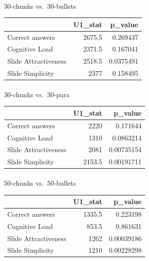 \documentclass[
  letterpaper,
  DIV=11,
  numbers=noendperiod]{scrartcl}
\makeatletter
\let\oldparagraph\paragraph
\renewcommand{\paragraph}{
    \@ifstar
      \xxxParagraphStar
      \xxxParagraphNoStar
  }
\newcommand{\xxxParagraphStar}[1]{\oldparagraph*{#1}\mbox{}}
\newcommand{\xxxParagraphNoStar}[1]{\oldparagraph{#1}\mbox{}}
\newcounter{none} %
\makeatother
\begin{document}
\paragraph{30-chunks vs.~30-bullets}\label{chunks-vs.-30-bullets}

{\def\LTcaptype{none} %
\begin{longtable}[]{@{}lrr@{}}
\toprule\noalign{}
& U1\_stat & p\_value \\
\midrule\noalign{}
\endhead
\bottomrule\noalign{}
\endlastfoot
Correct answers & 2675.5 & 0.269437 \\
Cognitive Load & 2371.5 & 0.167041 \\
Slide Attractiveness & 2518.5 & 0.0375491 \\
Slide Simplicity & 2377 & 0.158495 \\
\end{longtable}
}

\paragraph{30-chunks vs.~30-para}\label{chunks-vs.-30-para}

{\def\LTcaptype{none} %
\begin{longtable}[]{@{}lrr@{}}
\toprule\noalign{}
& U1\_stat & p\_value \\
\midrule\noalign{}
\endhead
\bottomrule\noalign{}
\endlastfoot
Correct answers & 2220 & 0.171644 \\
Cognitive Load & 1310 & 0.0863214 \\
Slide Attractiveness & 2081 & 0.00735154 \\
Slide Simplicity & 2153.5 & 0.00191711 \\
\end{longtable}
}

\paragraph{50-chunks vs.~50-bullets}\label{chunks-vs.-50-bullets}

{\def\LTcaptype{none} %
\begin{longtable}[]{@{}lrr@{}}
\toprule\noalign{}
& U1\_stat & p\_value \\
\midrule\noalign{}
\endhead
\bottomrule\noalign{}
\endlastfoot
Correct answers & 1335.5 & 0.223198 \\
Cognitive Load & 853.5 & 0.861631 \\
Slide Attractiveness & 1262 & 0.00039186 \\
Slide Simplicity & 1210 & 0.00228298 \\
\end{longtable}
}
\end{document}
